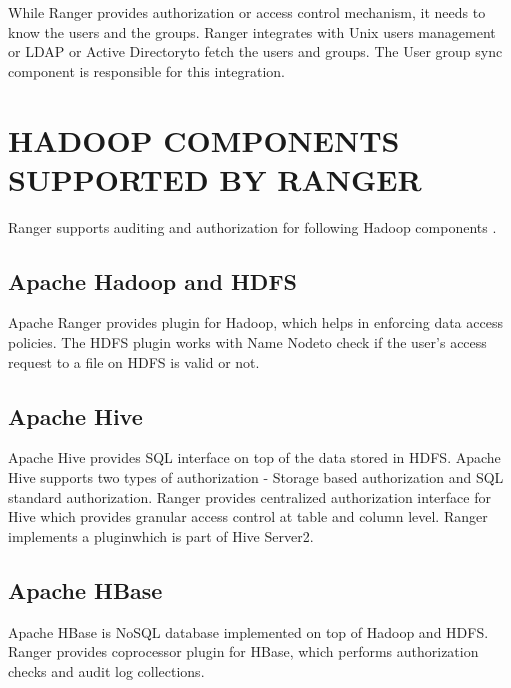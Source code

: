 \documentclass[9pt,twocolumn,twoside]{../../styles/osajnl}
\begin{document}
While Ranger provides authorization or access control mechanism, it needs to
know the users and the groups. Ranger integrates with Unix users management or
LDAP or Active Directory\SE to fetch the users and groups. The User group sync
component is responsible for this integration.



\section{HADOOP COMPONENTS SUPPORTED BY RANGER}


Ranger supports auditing and authorization for following Hadoop components
\cite{www-ranger-faq}.

\subsection{Apache Hadoop and HDFS}

Apache Ranger provides plugin for Hadoop, which helps in enforcing data access
policies. The HDFS plugin works with Name Node\SE to check if the user's access
request to a file on HDFS is valid or not.



\subsection{Apache Hive}

Apache Hive provides SQL interface on top of the data stored in HDFS. Apache
Hive supports two types of authorization - Storage based authorization and
SQL standard authorization. Ranger provides centralized authorization
interface for Hive which provides granular access control at table and column
 level. Ranger implements a plugin\GE which is part of Hive Server2.


\subsection{Apache HBase}
Apache HBase is NoSQL database implemented on top of Hadoop and HDFS. Ranger
provides coprocessor plugin for HBase, which performs authorization checks and
 audit log collections.
\end{document}
